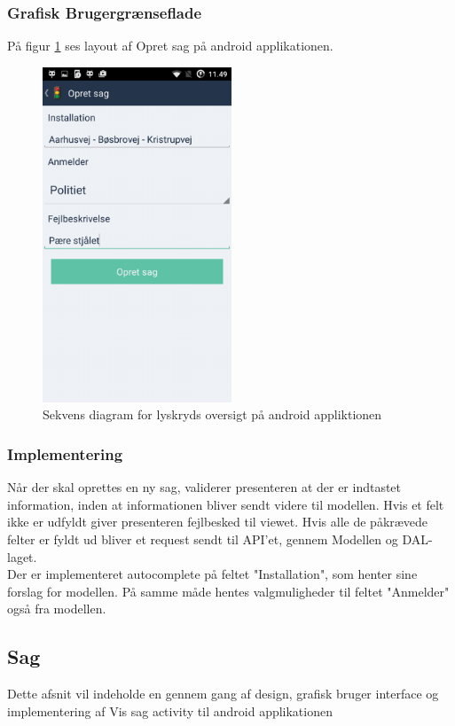 	\subsubsection{Grafisk Brugergrænseflade}
	På figur \ref{fig:Opret sag på android applikationen } ses layout af Opret sag på android applikationen.
	\begin{figure} [!ht]
		\begin{center}
			\includegraphics[height=10cm]{Android/Billeder/AndroidOpretSag}
		\end{center}
		\caption{Sekvens diagram for lyskryds oversigt på android appliktionen}
		\label{fig:Opret sag på android applikationen }
	\end{figure}
	
	\subsubsection{Implementering}
	Når der skal oprettes en ny sag, validerer presenteren at der er indtastet information, inden at informationen bliver sendt videre til modellen. Hvis et felt ikke er udfyldt giver presenteren fejlbesked til viewet. Hvis alle de påkrævede felter er fyldt ud bliver et request sendt til API'et, gennem Modellen og DAL-laget.
	\\Der er implementeret autocomplete på feltet "Installation", som henter sine forslag for modellen. På samme måde hentes valgmuligheder til feltet "Anmelder" også fra modellen.
	\pagebreak
	
	
	\subsection{Sag}
	Dette afsnit vil indeholde en gennem gang af design, grafisk bruger interface og implementering af Vis sag activity til android applikationen
